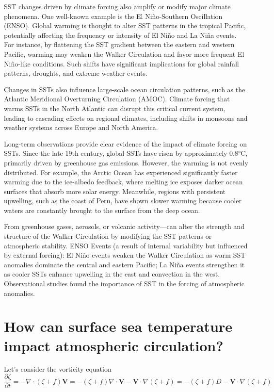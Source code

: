 SST changes driven by climate forcing also amplify or modify major climate phenomena. One well-known example is the El Niño-Southern Oscillation (ENSO). Global warming is thought to alter SST patterns in the tropical Pacific, potentially affecting the frequency or intensity of El Niño and La Niña events. For instance, by flattening the SST gradient between the eastern and western Pacific, warming may weaken the Walker Circulation and favor more frequent El Niño-like conditions. Such shifts have significant implications for global rainfall patterns, droughts, and extreme weather events.

Changes in SSTs also influence large-scale ocean circulation patterns, such as the Atlantic Meridional Overturning Circulation (AMOC). Climate forcing that warms SSTs in the North Atlantic can disrupt this critical current system, leading to cascading effects on regional climates, including shifts in monsoons and weather systems across Europe and North America.

Long-term observations provide clear evidence of the impact of climate forcing on SSTs. Since the late 19th century, global SSTs have risen by approximately 0.8°C, primarily driven by greenhouse gas emissions. However, the warming is not evenly distributed. For example, the Arctic Ocean has experienced significantly faster warming due to the ice-albedo feedback, where melting ice exposes darker ocean surfaces that absorb more solar energy. Meanwhile, regions with persistent upwelling, such as the coast of Peru, have shown slower warming because cooler waters are constantly brought to the surface from the deep ocean.


From greenhouse gases, aerosols, or volcanic activity—can alter the strength and structure of the Walker Circulation by modifying the SST patterns or atmospheric stability.
ENSO Events (a result of internal variability but influenced by external forcing): El Niño events weaken the Walker Circulation as warm SST anomalies dominate the central and eastern Pacific; La Niña events strengthen it as cooler SSTs enhance upwelling in the east and convection in the west.
Observational studies found the importance of SST in the forcing of atmospheric anomalies.


\section{How can surface sea temperature impact atmospheric circulation?}

Let's consider the vorticity equation
\begin{equation}\label{eq. 2.1}
	\frac{\partial \zeta}{\partial t} = - \nabla \cdot (\zeta + f) \mathbf{V} = - (\zeta + f) \nabla \cdot \mathbf{V} - \mathbf{V} \cdot \nabla (\zeta + f) = - (\zeta + f) D - \mathbf{V} \cdot \nabla (\zeta + f)
\end{equation}

